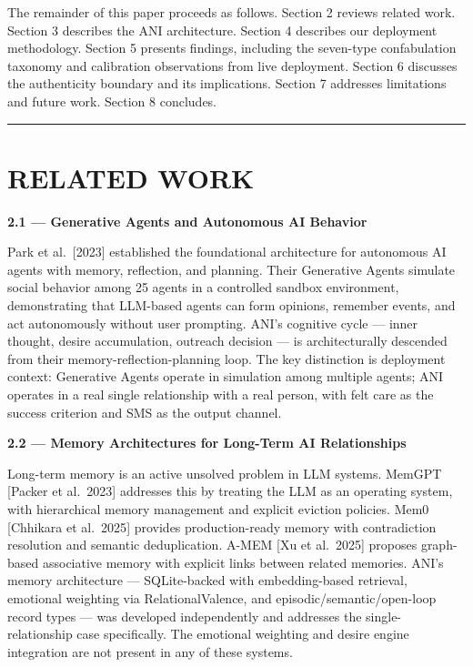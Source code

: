 \documentclass[12pt]{article}
\begin{document}
The remainder of this paper proceeds as follows. Section 2 reviews
related work. Section 3 describes the ANI architecture. Section 4
describes our deployment methodology. Section 5 presents findings,
including the seven-type confabulation taxonomy and calibration
observations from live deployment. Section 6 discusses the authenticity
boundary and its implications. Section 7 addresses limitations and
future work. Section 8 concludes.

\begin{center}\rule{0.5\linewidth}{0.5pt}\end{center}

%
\section{RELATED WORK}\label{related-work}

\textbf{2.1 --- Generative Agents and Autonomous AI Behavior}

Park et al.~{[}2023{]} established the foundational architecture for
autonomous AI agents with memory, reflection, and planning. Their
Generative Agents simulate social behavior among 25 agents in a
controlled sandbox environment, demonstrating that LLM-based agents can
form opinions, remember events, and act autonomously without user
prompting. ANI's cognitive cycle --- inner thought, desire accumulation,
outreach decision --- is architecturally descended from their
memory-reflection-planning loop. The key distinction is deployment
context: Generative Agents operate in simulation among multiple agents;
ANI operates in a real single relationship with a real person, with felt
care as the success criterion and SMS as the output channel.

\textbf{2.2 --- Memory Architectures for Long-Term AI Relationships}

Long-term memory is an active unsolved problem in LLM systems. MemGPT
{[}Packer et al.~2023{]} addresses this by treating the LLM as an
operating system, with hierarchical memory management and explicit
eviction policies. Mem0 {[}Chhikara et al.~2025{]} provides
production-ready memory with contradiction resolution and semantic
deduplication. A-MEM {[}Xu et al.~2025{]} proposes graph-based
associative memory with explicit links between related memories. ANI's
memory architecture --- SQLite-backed with embedding-based retrieval,
emotional weighting via RelationalValence, and
episodic/semantic/open-loop record types --- was developed independently
and addresses the single-relationship case specifically. The emotional
weighting and desire engine integration are not present in any of these
systems.
\end{document}
